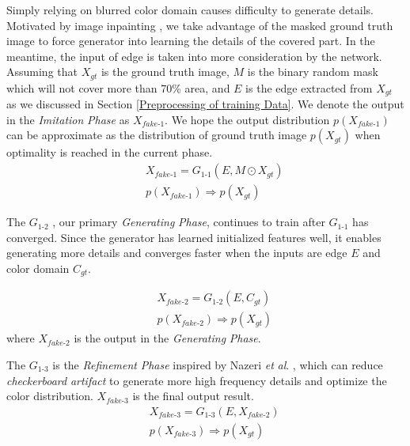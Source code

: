 \documentclass[10pt,twocolumn,letterpaper]{article} \usepackage{amsfonts,amssymb}
\begin{document}
Simply relying on blurred color domain causes difficulty to generate details. Motivated by image inpainting \cite{nazeri2019edgeconnect,song2018spg,dupont2018probabilistic}, we take advantage of the masked ground truth image to force generator into learning the details of the covered part. In the meantime, the input of edge is taken into more consideration by the network. Assuming that $X_{gt}$ is the ground truth image, $M$ is the binary random mask which will not cover more than 70\% area, and $E$ is the edge extracted from $X_{gt}$ as we discussed in Section \ref{Preprocessing of training Data}. We denote the output in the \emph{Imitation} \emph{Phase} as $X_{fake\text{-}1}$. We hope the output distribution $p(X_{fake\text{-}1})$ can be approximate as the distribution of ground truth image $p(X_{gt})$ when optimality is reached in the current phase.
\begin{eqnarray}
\label{G1-1}
&&X_{fake\text{-}1} = G_{1\text{-}1}(E , M \odot X_{gt})\\
&&p(X_{fake\text{-}1}) \Longrightarrow p(X_{gt})
\end{eqnarray}

The $G_{1\text{-}2}$ , our primary \emph{Generating} \emph{Phase}, continues to train after $G_{1\text{-}1}$ has converged. Since the generator has learned initialized features well, it enables generating more details and converges faster when the inputs are edge $E$ and color domain $C_{gt}$.

\begin{eqnarray}
\label{G1-2}
&&X_{fake\text{-}2} = G_{1\text{-}2}(E , C_{gt})\\
&&p(X_{fake\text{-}2}) \Longrightarrow p(X_{gt})
\end{eqnarray}
where $X_{fake\text{-}2}$ is the output in the \emph{Generating} \emph{Phase}.

The $G_{1\text{-}3}$ is the \emph{Refinement} \emph{Phase} inspired by Nazeri \emph{et} \emph{al}. \cite{nazeri2019edgeconnect}, which can reduce \emph{checkerboard} \emph{artifact} to generate more high frequency details and optimize the color distribution. $X_{fake\text{-}3}$ is the final output result.
\begin{eqnarray}
\label{G1-3}
&&X_{fake\text{-}3} = G_{1\text{-}3}(E , X_{fake\text{-}2})\\
&&p(X_{fake\text{-}3}) \Longrightarrow p(X_{gt})
\end{eqnarray}
\end{document}
